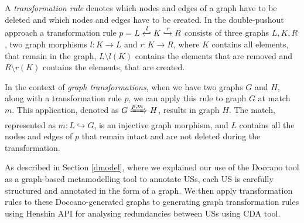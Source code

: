 \begin{definition}
A \emph{transformation rule} denotes which nodes and edges of a graph have to be deleted and which nodes and edges have to be created.
In the double-pushout approach a transformation rule $p = L \xhookleftarrow{l} K \xhookrightarrow{r} R$ consists of three graphs $L,K,R$, two graph morphisms $l: K \to L$ and $r: K \to R$, where $K$ contains all elements, that remain in the graph, $L \setminus l(K)$ contains the elements that are removed and $R \setminus r(K)$ contains the elements, that are created.
\end{definition}
\begin{definition}
In the context of \emph{graph transformations}, when we have two graphs $G$ and $H$, along with a transformation rule $p$, we can apply this rule to graph $G$ at match $m$. This application, denoted as $G \xRightarrow{p,m} H$, results in graph $H$. The match, represented as $m : L \hookrightarrow G$, is an injective graph morphism, and $L$ contains all the nodes and edges of $p$ that remain intact and are not deleted during the transformation.
\end{definition}
As described in Section \ref{dmodel}, where we explained our use of the Doccano tool as a graph-based metamodelling tool to annotate USs, each US is carefully structured and annotated in the form of a graph. We then apply transformation rules to these Doccano-generated graphs to generating graph transformation rules using Henshin API for analysing redundancies between USs using CDA tool.


